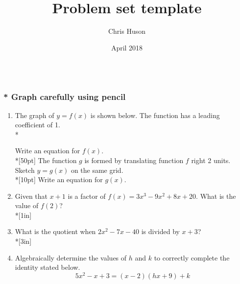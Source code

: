 \documentclass[12pt, oneside]{article}
\title{Problem set template}
\author{Chris Huson}
\date{April 2018}
\begin{document}

\subsubsection*{\\* \textnormal{Graph carefully using pencil}}

\begin{enumerate}

\item The graph of $y = f(x)$ is shown below. The function has a leading coefficient of 1.\\*
\begin{center}
\end{center}
Write an equation for $f(x)$.\\*[50pt]
The function $g$ is formed by translating function $f$ right 2 units. Sketch $y=g(x)$ on the same grid.\\*[10pt]
Write an equation for $g(x)$.

\newpage


\item Given that $x+1$ is a factor of $f(x)=3x^3-9x^2+8x+20$. What is the value of $f(2)$? \\*[1in]

\item What is the quotient when $2x^2-7x-40$ is divided by $x + 3$?\\*[3in]

\item Algebraically determine the values of $h$ and $k$ to correctly complete the identity stated below.
\[5x^2-x+3=(x-2)(hx+9)+k\] %


\end{enumerate}
\end{document}
